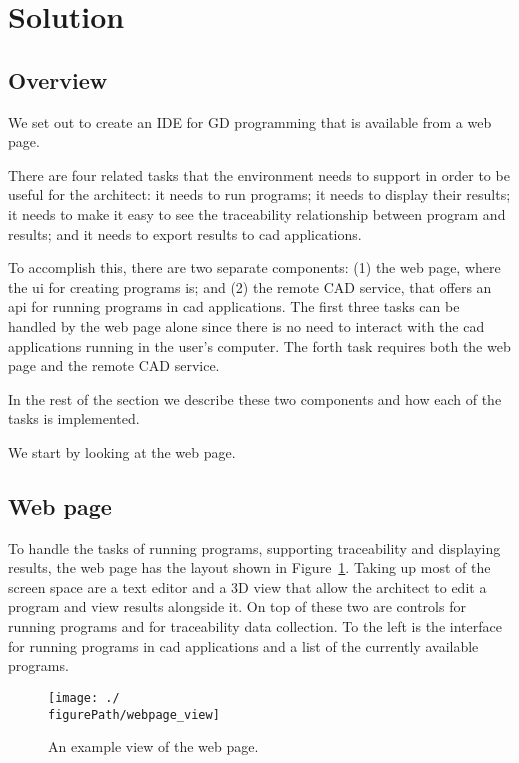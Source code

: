 
\section{Solution}
\label{sec:solution}


\subsection{Overview}
We set out to create an IDE for GD programming that is available from a web page.

There are four related tasks that the environment needs to support in order to be useful for the architect:
it needs to run programs; it needs to display their results; it needs to make it easy to see the traceability relationship between program and results; and it needs to export results to \gls{cad} applications.

To accomplish this, there are two separate components: (1) the web page, where the \gls{ui} for creating programs is; and (2) the remote CAD service, that offers an \gls{api} for running programs in \gls{cad} applications.
The first three tasks can be handled by the web page alone since there is no need to interact with the \gls{cad} applications running in the user's computer.
The forth task requires both the web page and the remote CAD service.

In the rest of the section we describe these two components and how each of the tasks is implemented.

We start by looking at the web page.


\subsection{Web page}
To handle the tasks of running programs, supporting traceability and displaying results, the web page has the layout shown in Figure~\ref{fig:page:view}.
Taking up most of the screen space are a text editor and a 3D view that allow the architect to edit a program and view results alongside it.
On top of these two are controls for running programs and for traceability data collection.
To the left is the interface for running programs in \gls{cad} applications and a list of the currently available programs.


\begin{figure}
  \centering
  \texttt{[image: ./\\figurePath/webpage\_view]}
  \caption{An example view of the web page.}
  \label{fig:page:view}
\end{figure}


